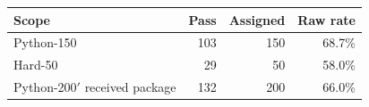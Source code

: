 \begin{tabular}{lrrr}
\toprule
\textbf{Scope} & \textbf{Pass} & \textbf{Assigned} & \textbf{Raw rate} \\
\midrule
Python-150 & 103 & 150 & 68.7\% \\
Hard-50 & 29 & 50 & 58.0\% \\
Python-200$'$ received package & 132 & 200 & 66.0\% \\
\bottomrule
\end{tabular}
